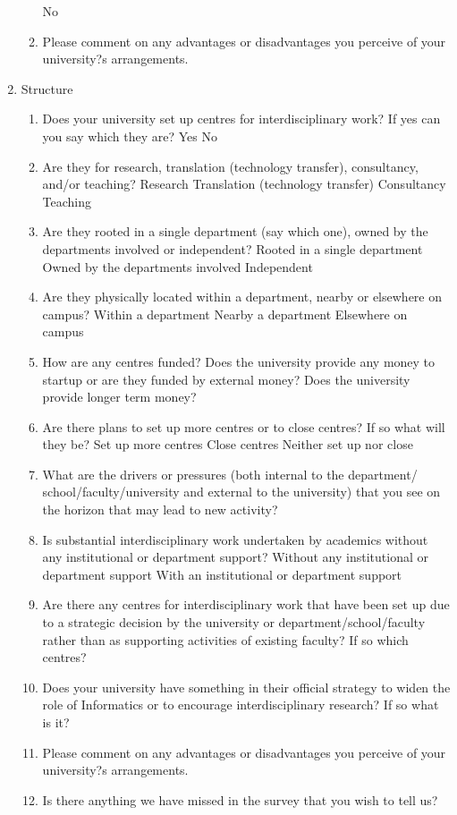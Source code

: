 \begin{enumerate}
\begin{enumerate}
No
\item Please comment on any advantages or disadvantages you perceive of
your university?s arrangements.
\end{enumerate}
\item Structure
\begin{enumerate}
\item Does your university set up centres for interdisciplinary work? If
yes can you say which they are?
Yes
No
\item Are they for research, translation (technology transfer),
consultancy, and/or teaching?
Research
Translation (technology transfer)
Consultancy
Teaching
\item Are they rooted in a single department (say which one), owned by
the departments involved or independent?
Rooted in a single department
Owned by the departments involved
Independent
\item Are they physically located within a department, nearby or
elsewhere on campus?
Within a department
Nearby a department
Elsewhere on campus
\item How are any centres funded? Does the university provide any
money to startup or are they funded by external money? Does the
university provide longer term money?
\item Are there plans to set up more centres or to close centres? If so
what will they be?
Set up more centres
Close centres
Neither set up nor close
\item What are the drivers or pressures (both internal to the department/
school/faculty/university and external to the university)
that you see on the horizon that may lead to new activity?
\item Is substantial interdisciplinary work undertaken by academics
without any institutional or department support?
Without any institutional or department support
With an institutional or department support
\item Are there any centres for interdisciplinary work that have been set
up due to a strategic decision by the university or
department/school/faculty rather than as supporting activities of
existing faculty? If so which centres?
\item Does your university have something in their official strategy to
widen the role of Informatics or to encourage interdisciplinary
research? If so what is it?
\item Please comment on any advantages or disadvantages you perceive of your university?s arrangements.
\item Is there anything we have missed in the survey that you wish to tell us?
\end{enumerate}
\end{enumerate}
